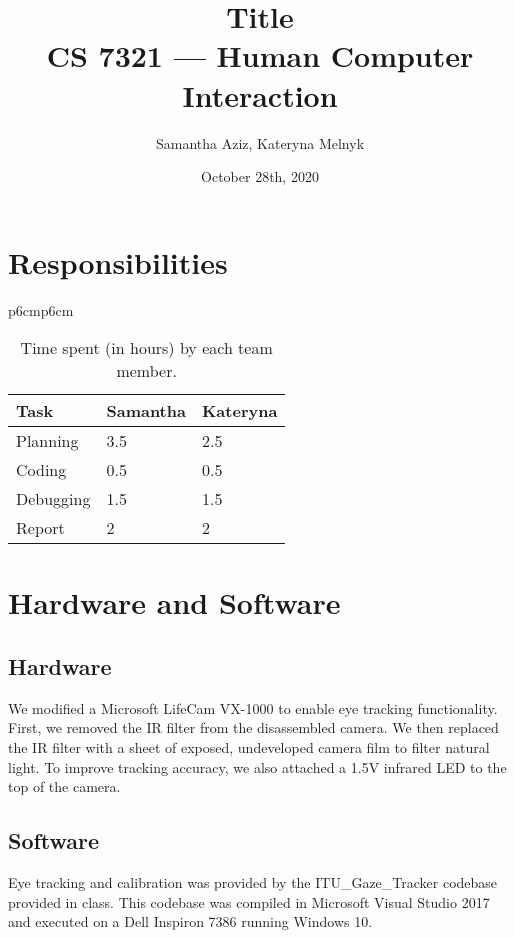 \documentclass[11pt]{article}
\begin{document}
\title{Title \\ CS 7321 — Human Computer Interaction}
\author{Samantha Aziz, Kateryna Melnyk} 
\date{October 28th, 2020}
\maketitle

\section{Responsibilities} %
    \begin{table}[h!]
        \begin{center}
        \begin{tabular}{p{6cm}p{6cm}}
            \begin{tabular}{lll}
            \toprule
            Task & Samantha & Kateryna \\
            \midrule
            Planning & 3.5 & 2.5 \\
            \midrule
            Coding & 0.5 & 0.5 \\
            \midrule
            Debugging & 1.5 & 1.5 \\
            \midrule
            Report & 2 & 2 \\
            \bottomrule
            \end{tabular}
        \end{tabular}
        \caption{Time spent (in hours) by each team member.}
   \end{center}
   \end{table}

\section{Hardware and Software} %
\label{setup}   
\subsection{Hardware} 
We modified a Microsoft LifeCam VX-1000 to enable eye tracking functionality. First, we removed the IR filter from the disassembled camera. We then replaced the IR filter with a sheet of exposed, undeveloped camera film to filter natural light. To improve tracking accuracy, we also attached a 1.5V infrared LED to the top of the camera. \\

\subsection{Software}
Eye tracking and calibration was provided by the ITU\_Gaze\_Tracker codebase provided in class. This codebase was compiled in Microsoft Visual Studio 2017 and executed on a Dell Inspiron 7386 running Windows 10.
\end{document}
